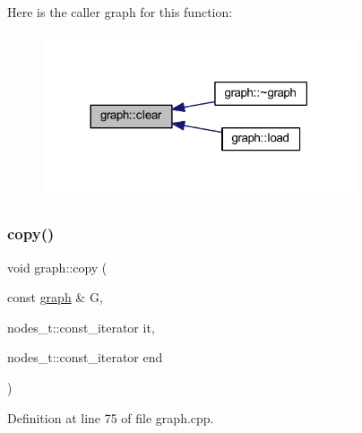 Here is the caller graph for this function\+:
\nopagebreak
\begin{figure}[H]
\begin{center}
\leavevmode
\includegraphics[width=261pt]{classgraph_a9ff5d6af3653e79f87b836701453f55a_icgraph}
\end{center}
\end{figure}
\mbox{\label{classgraph_abc39d65a6ca3f3165bc71c7125dfd22e}} 
\subsubsection{\texorpdfstring{copy()}{copy()}}
{\footnotesize\ttfamily void graph\+::copy (\begin{DoxyParamCaption}\item[{const \mbox{\hyperlink{classgraph}{graph}} \&}]{G,  }\item[{nodes\+\_\+t\+::const\+\_\+iterator}]{it,  }\item[{nodes\+\_\+t\+::const\+\_\+iterator}]{end }\end{DoxyParamCaption})\hspace{0.3cm}{\ttfamily [private]}}



Definition at line 75 of file graph.\+cpp.


